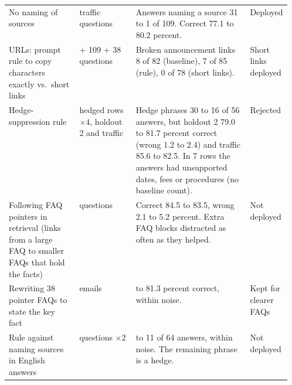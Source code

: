 \begin{table}[htbp]
\begin{tabularx}{\linewidth}{@{}>{\raggedright\arraybackslash}p{0.25\linewidth}>{\raggedright\arraybackslash}p{0.2\linewidth}>{\raggedright\arraybackslash}X>{\raggedright\arraybackslash}p{0.11\linewidth}@{}}
No naming of sources & 109 traffic questions & Answers naming a source 31 to 1 of 109. Correct 77.1 to 80.2 percent. & Deployed \\
URLs: prompt rule to copy characters exactly vs.\ short links & 334 + 109 + 38 questions & Broken announcement links 8 of 82 (baseline), 7 of 85 (rule), 0 of 78 (short links). & Short links deployed \\
\midrule
Hedge-suppression rule & 14 hedged rows $\times4$, holdout 2 and traffic & Hedge phrases 30 to 16 of 56 answers, but holdout 2 79.0 to 81.7 percent correct (wrong 1.2 to 2.4) and traffic 85.6 to 82.5. In 7 rows the answers had unsupported dates, fees or procedures (no baseline count). & Rejected \\
Following FAQ pointers in retrieval (links from a large FAQ to smaller FAQs that hold the facts) & 99 questions & Correct 84.5 to 83.5, wrong 2.1 to 5.2 percent. Extra FAQ blocks distracted as often as they helped. & Not deployed \\
Rewriting 38 pointer FAQs to state the key fact & 334 emails & 83.6 to 81.3 percent correct, within noise. & Kept for clearer FAQs \\
Rule against naming sources in English answers & 32 questions $\times2$ & 15 to 11 of 64 answers, within noise. The remaining phrase is a hedge. & Not deployed \\
\bottomrule
\end{tabularx}
\end{table}

